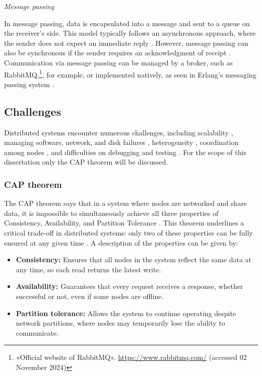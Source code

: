 \textit{Message passing}

In message passing, data is encapsulated into a message and sent to a queue on the receiver’s side. This model typically follows an asynchronous approach, where the sender does not expect an immediate reply \cite{Kleppmann2017, Coulouris2012}. However, message passing can also be synchronous if the sender requires an acknowledgment of receipt \cite{Coulouris2012}. Communication via message passing can be managed by a broker, such as RabbitMQ,\footnote{«Official website of RabbitMQ». \url{https://www.rabbitmq.com/} (accessed 02 November 2024)}, for example, or implemented natively, as seen in Erlang’s messaging passing system \cite{Nystrom2009, Tanenbaum2023}.

\subsection{Challenges}

Distributed systems encounter numerous challenges, including scalability \cite{Ahmed2013}, managing software, network, and disk failures \cite{Naik2021, aws-challenges-dist-sys}, heterogeneity \cite{Coulouris2012}, coordination among nodes \cite{Vitillo2021}, and difficulties on debugging and testing \cite{Beschastnikh2020, aws-challenges-dist-sys}. For the scope of this dissertation only the CAP theorem will be discussed.

\subsubsection{CAP theorem}

The CAP theorem says that in a system where nodes are networked and share data, it is impossible to simultaneously achieve all three properties of Consistency, Availability, and Partition Tolerance \cite{Tanenbaum2023, Vitillo2021}. This theorem underlines a critical trade-off in distributed systems: only two of these properties can be fully ensured at any given time \cite{ibm-cap-theorem, Gilbert2012}. A description of the properties can be given by:

\begin{itemize}
	\item \textbf{Consistency:} Ensures that all nodes in the system reflect the same data at any time, so each read returns the latest write.
	\item \textbf{Availability:} Guarantees that every request receives a response, whether successful or not, even if some nodes are offline.
	\item \textbf{Partition tolerance:} Allows the system to continue operating despite network partitions, where nodes may temporarily lose the ability to communicate.
\end{itemize}

